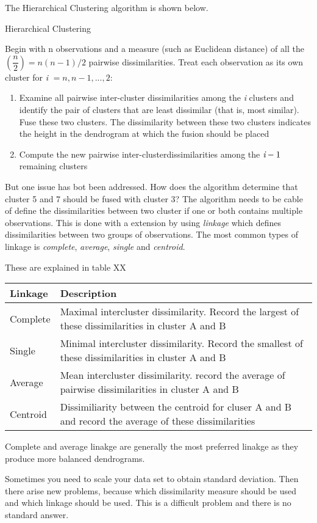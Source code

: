 The Hierarchical Clustering algorithm is shown below.

\begin{algorithm}
	\caption{Hierarchical Clustering}
	\label{algo:HierarchicalClustering}
	\begin{algorithmic}[1]
 		\State Begin with n observations and a measure (such as Euclidean distance) of all the $(\dfrac{n}{2}) =n(n-1)/2 $ pairwise dissimilarities. Treat each observation as its own cluster 
 		\State for \emph{i} $= n,n-1,...,2:$
 		\begin{enumerate}[label=(\alph*)]
 			\item Examine all pairwise inter-cluster dissimilarities among the \emph{i} clusters and identify the pair of clusters that are least dissimilar (that is, most similar). Fuse these two clusters. The dissimilarity between these two clusters indicates the height in the dendrogram at which the fusion should be placed 
 			\item Compute the new pairwise inter-clusterdissimilarities among the $\emph{i}-1$ remaining clusters  
 		\end{enumerate}
 	\end{algorithmic}
 \end{algorithm}

But one issue has bot been addressed. How does the algorithm determine that cluster 5 and 7 should be fused with cluster 3? The algorithm needs to be cable of define the dissimilarities between two cluster if one or both contains multiple observations. This is done with a extension by using \emph{linkage} which defines dissimilarities between two groups of observations. The most common types of linkage is \emph{complete}, \emph{average}, \emph{single} and
\emph{centroid}.

These are explained in table XX
\begin{center}
	\begin{tabular}{ | l | p{12cm} |}
		\hline
		Linkage & Description \\ \hline
		Complete & Maximal intercluster dissimilarity. Record the largest of these dissimilarities in cluster A and B \\ \hline
		Single & Minimal intercluster dissimilarity. Record the smallest of these dissimilarities in cluster A and B \\ \hline
		Average & Mean intercluster dissimilarity. record the average of pairwise dissimilarities in cluster A and B\\
		\hline
		Centroid & Dissimiliarity between the centroid for cluser A and B and record the average of these dissimilarities
		\\
		\hline
	\end{tabular}
\end{center}

Complete and average linakge are generally the most preferred linakge as they produce more balanced dendrograms. 

Sometimes you need to scale your data set to obtain standard deviation. Then there arise new problems, because which dissimilarity measure should be used and which linkage should be used. This is a difficult problem and there is no standard answer.